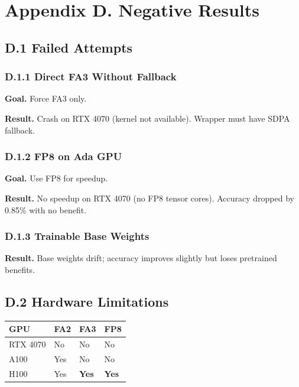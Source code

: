 \section{Appendix D. Negative Results}

\subsection{D.1 Failed Attempts}

\subsubsection{D.1.1 Direct FA3 Without Fallback}

\textbf{Goal.} Force FA3 only.

\textbf{Result.} Crash on RTX 4070 (kernel not available). Wrapper must 
have SDPA fallback.

\subsubsection{D.1.2 FP8 on Ada GPU}

\textbf{Goal.} Use FP8 for speedup.

\textbf{Result.} No speedup on RTX 4070 (no FP8 tensor cores). Accuracy dropped 
by 0.85\% with no benefit.

\subsubsection{D.1.3 Trainable Base Weights}

\textbf{Result.} Base weights drift; accuracy improves slightly but loses 
pretrained benefits.

\subsection{D.2 Hardware Limitations}

\begin{table}[H]
\centering
\small
\begin{tabular}{llll}
\toprule
\textbf{GPU} & \textbf{FA2} & \textbf{FA3} & \textbf{FP8} \\
\midrule
RTX 4070 & No & No & No \\
A100 & Yes & No & No \\
H100 & Yes & \textbf{Yes} & \textbf{Yes} \\
\bottomrule
\end{tabular}
\end{table}

